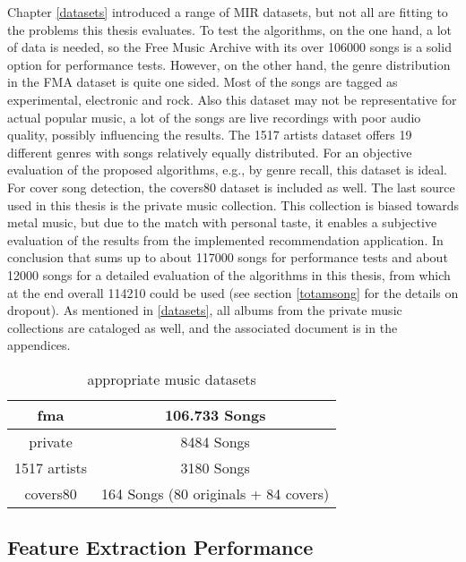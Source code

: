 Chapter \ref{datasets} introduced a range of MIR datasets, but not all are fitting to the problems this thesis evaluates. To test the algorithms, on the one hand, a lot of data is needed, so the Free Music Archive with its over 106000 songs is a solid option for performance tests. However, on the other hand, the genre distribution in the FMA dataset is quite one sided. Most of the songs are tagged as experimental, electronic and rock. Also this dataset may not be representative for actual popular music, a lot of the songs are live recordings with poor audio quality, possibly influencing the results.
The 1517 artists dataset offers 19 different genres with songs relatively equally distributed. For an objective evaluation of the proposed algorithms, e.g., by genre recall, this dataset is ideal. For cover song detection, the covers80 dataset is included as well.
The last source used in this thesis is the private music collection. This collection is biased towards metal music, but due to the match with personal taste, it enables a subjective evaluation of the results from the implemented recommendation application. 
In conclusion that sums up to about 117000 songs for performance tests and about 12000 songs for a detailed evaluation of the algorithms in this thesis, from which at the end overall 114210 could be used (see section \ref{totamsong} for the details on dropout). As mentioned in \ref{datasets}, all albums from the private music collections are cataloged as well, and the associated document is in the appendices. 

\begin{table}[h]
	\label{used_dsets}
	\begin{center}
		\begin{tabular}{|c||c|}
			\hline
			fma & 106.733 Songs\\
			\hline
			private & 8484 Songs\\
			\hline
			1517 artists & 3180 Songs\\
			\hline
			covers80 & 164 Songs (80 originals + 84 covers)\\
			\hline
		\end{tabular}
	\end{center}
	\caption{appropriate music datasets}
\end{table}
\FloatBarrier

\subsection{Feature Extraction Performance}

